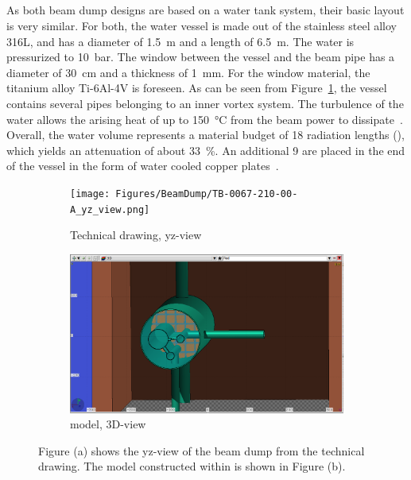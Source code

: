 \subsection{\designone}
\label{BeamDumps:design:design1}
As both beam dump designs are based on a water tank system, their basic layout is very similar.
For both, the water vessel is made out of the stainless steel alloy 316L, and has a diameter of \SI{1.5}{\meter} and a length of \SI{6.5}{\meter}.
The water is pressurized to \SI{10}{\bar}.
The window between the vessel and the beam pipe has a diameter of \SI{30}{\centi\meter} and a thickness of \SI{1}{\milli\meter}.
For the window material, the titanium alloy Ti-6Al-4V is foreseen.
As can be seen from Figure~\ref{fig:BeamDumps:design1}, the vessel contains several pipes belonging to an inner vortex system.
The turbulence of the water allows the arising heat of up to \SI{150}{\celsius} from the beam power to dissipate~\cite[p. 3]{Dump_report}.
\\Overall, the water volume represents a material budget of 18 radiation lengths (\si{\xzero}), which yields an attenuation of about \SI{33}{\percent}.
An additional \SI{9}{\xzero} are placed in the end of the vessel in the form of water cooled copper plates~\cite[p. 2]{Dump_report}.

\begin{figure}[h]
 \centering
  \begin{subfigure}[b]{0.49\textwidth}
   \centering
    \texttt{[image: Figures/BeamDump/TB-0067-210-00-A\_yz\_view.png]}
   \caption{Technical drawing, yz-view}
   \end{subfigure}
   \hfill
    \begin{subfigure}[b]{0.49\textwidth}
   \centering
    \includegraphics[width=\textwidth]{Figures/BeamDump/Design1_geometry_3Dinside.png}
   \caption{\fluka model, 3D-view}
   \end{subfigure}
   \caption[ILC main beam dump design 1]{Figure (a) shows the yz-view of the beam dump \designone from the technical drawing.
   The \fluka model constructed within \flair is shown in Figure (b).}
   \label{fig:BeamDumps:design1}
 \end{figure}

